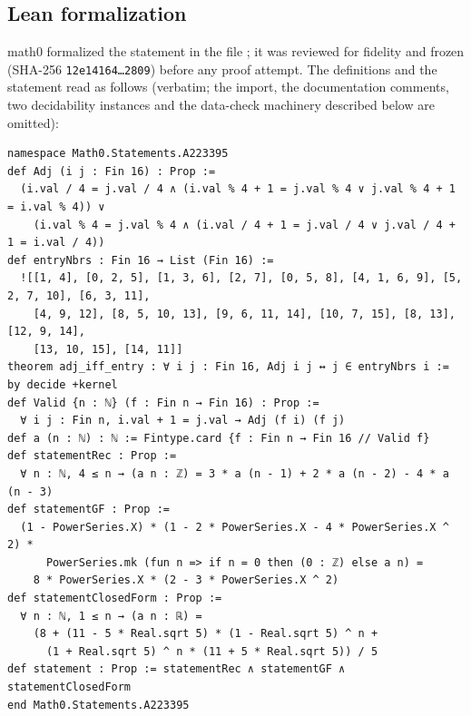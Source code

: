 \documentclass[11pt]{amsart}
\theoremstyle{plain}
\theoremstyle{definition}
\begin{document}
\subsection*{Lean formalization}
math0 formalized the statement in the file ; it was reviewed for fidelity and frozen (SHA-256 \texttt{12e14164\ldots 2809}) before any proof attempt. The definitions and the statement read as follows (verbatim; the import, the documentation comments, two decidability instances and the data-check machinery described below are omitted):
\begin{lstlisting}
namespace Math0.Statements.A223395
def Adj (i j : Fin 16) : Prop :=
  (i.val / 4 = j.val / 4 ∧ (i.val % 4 + 1 = j.val % 4 ∨ j.val % 4 + 1 = i.val % 4)) ∨
    (i.val % 4 = j.val % 4 ∧ (i.val / 4 + 1 = j.val / 4 ∨ j.val / 4 + 1 = i.val / 4))
def entryNbrs : Fin 16 → List (Fin 16) :=
  ![[1, 4], [0, 2, 5], [1, 3, 6], [2, 7], [0, 5, 8], [4, 1, 6, 9], [5, 2, 7, 10], [6, 3, 11],
    [4, 9, 12], [8, 5, 10, 13], [9, 6, 11, 14], [10, 7, 15], [8, 13], [12, 9, 14],
    [13, 10, 15], [14, 11]]
theorem adj_iff_entry : ∀ i j : Fin 16, Adj i j ↔ j ∈ entryNbrs i := by decide +kernel
def Valid {n : ℕ} (f : Fin n → Fin 16) : Prop :=
  ∀ i j : Fin n, i.val + 1 = j.val → Adj (f i) (f j)
def a (n : ℕ) : ℕ := Fintype.card {f : Fin n → Fin 16 // Valid f}
def statementRec : Prop :=
  ∀ n : ℕ, 4 ≤ n → (a n : ℤ) = 3 * a (n - 1) + 2 * a (n - 2) - 4 * a (n - 3)
def statementGF : Prop :=
  (1 - PowerSeries.X) * (1 - 2 * PowerSeries.X - 4 * PowerSeries.X ^ 2) *
      PowerSeries.mk (fun n => if n = 0 then (0 : ℤ) else a n) =
    8 * PowerSeries.X * (2 - 3 * PowerSeries.X ^ 2)
def statementClosedForm : Prop :=
  ∀ n : ℕ, 1 ≤ n → (a n : ℝ) =
    (8 + (11 - 5 * Real.sqrt 5) * (1 - Real.sqrt 5) ^ n +
      (1 + Real.sqrt 5) ^ n * (11 + 5 * Real.sqrt 5)) / 5
def statement : Prop := statementRec ∧ statementGF ∧ statementClosedForm
end Math0.Statements.A223395
\end{lstlisting}
\end{document}
